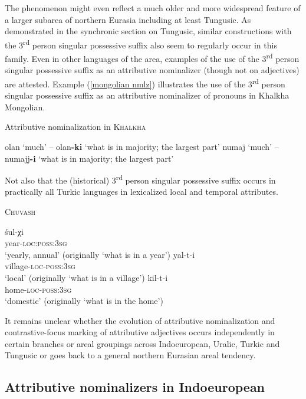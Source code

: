 The phenomenon might even reflect a much older and more widespread feature of a larger subarea of northern Eurasia including at least Tungusic. As demonstrated in the synchronic section  on Tungusic, similar constructions with the 3\textsuperscript{rd} person singular possessive suffix also seem to regularly occur in this family. Even in other languages of the area, examples of the use of the 3\textsuperscript{rd} person singular possessive suffix as an attributive nominalizer (though not on adjectives) are attested. Example (\ref{mongolian nmlz}) illustrates the use of the 3\textsuperscript{rd} person singular possessive suffix as an attributive nominalizer of pronouns in Khalkha Mongolian.
\begin{exe}
\ex Attributive nominalization in \textsc{Khalkha} \citep[6]{pavlov1985}\label{mongolian nmlz}
\begin{xlist}
\ex	olan ‘much’ – olan\textbf{-ki} ‘what is in majority; the largest part’
\ex	numaj ‘much’ – numajj\textbf{-i} ‘what is in majority; the largest part’
\end{xlist}
\end{exe}
Not also that the (historical) 3\textsuperscript{rd} person singular possessive suffix occurs in practically all Turkic languages in lexicalized local and temporal attributes. 
\begin{exe}
\ex \textsc{Chuvash} \citep[67-68]{benzing1963}
\begin{xlist}
\ex
\gll	śul-χi\\
	year-\textsc{loc:poss:3sg}\\
\glt	‘yearly, annual’ (originally ‘what is in a year’)
\ex
\gll	yal-t-i\\
	village-\textsc{loc-poss:3sg}\\
\glt	‘local’ (originally ‘what is in a village’)
\ex
\gll	kil-t-i\\
	home-\textsc{loc-poss:3sg}\\
\glt	‘domestic’ (originally ‘what is in the home’)
\end{xlist}
\end{exe}
It remains unclear whether the evolution of attributive nominalization and contrastive-focus marking of attributive adjectives occurs independently in certain branches or areal groupings across Indoeuropean, Uralic, Turkic and Tungusic or goes back to a general northern Eurasian areal tendency.

\subsection{Attributive nominalizers in Indoeuropean} \label{ie diachr}

